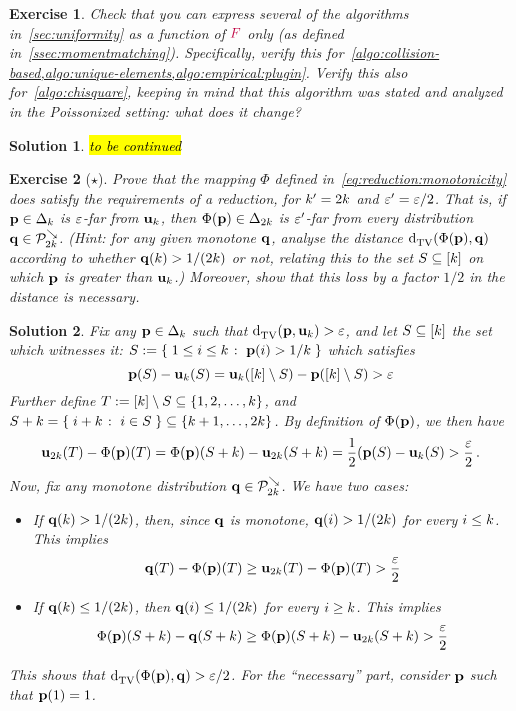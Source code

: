 \documentclass[biber]{nowfnt} %
\newtheorem{question}{Exercise}[chapter]
\newtheorem{solution}{Solution}[chapter]
\newcommand{\tbc}{\noindent\hl{\sc{}to be continued}\xspace}
\newcommand{\tbc}{}
\newcommand{\freq}{\textcolor{purple}{F}}
\newcommand{\freq}{F}
\begin{document}
\begin{question}\label{exo:reexpress:algos:frequency:only}
Check that you can express several of the algorithms in~\cref{sec:uniformity} as a function of $\freq$ only (as defined in~\cref{ssec:momentmatching}). Specifically, verify this for~\cref{algo:collision-based,algo:unique-elements,algo:empirical:plugin}. Verify this also for~\cref{algo:chisquare}, keeping in mind that this algorithm was stated and analyzed in the Poissonized setting: what does it change?
\end{question}
\begin{solution}
\tbc
\end{solution}

\begin{question}[$\star$]\label{ex:reduction:monotone}
  Prove that the mapping $\Phi$ defined in~\cref{eq:reduction:monotonicity} does satisfy the requirements of a reduction, for $k'=2k$ and $\varepsilon'=\varepsilon/2$. That is, if $\mathbf{p}\in\Delta_{k}$ is $\varepsilon$-far from $\mathbf{u}_k$, then $\Phi(\mathbf{p})\in\Delta_{2k}$ is $\varepsilon'$-far from every distribution $\mathbf{q}\in\mathcal{P}^{\searrow}_{2k}$. \textit{(Hint: for any given monotone $\mathbf{q}$, analyse the distance $\totalvardist{\Phi(\p)}{\q}$ according to whether $\mathbf{q}(k) > 1/(2k)$ or not, relating this to the set $S\subseteq[k]$ on which $\mathbf{p}$ is greater than $\mathbf{u}_k$.)} Moreover, show that this loss by a factor $1/2$ in the distance is necessary.
\end{question}
\begin{solution}
Fix any $\mathbf{p}\in\Delta_{k}$ such that $\totalvardist{\p}{\uniform_\ab}>\dst$, and let $S\subseteq [k]$ the set which witnesses it:
$S\eqdef \setOfSuchThat{ 1\leq i\leq \ab }{\p(i)> 1/\ab }$ 
which satisfies 
\[
	\mathbf{p}(S)-\mathbf{u}_k(S) = \mathbf{u}_k([k]\setminus S)- \mathbf{p}([k]\setminus S) >\varepsilon
\]
Further define $T := [k]\setminus S \subseteq \{1,2,\dots,k\}$, and $S+\ab = \setOfSuchThat{i+\ab}{i\in S} \subseteq \{\ab+1,\dots,2\ab\}$. 
By definition of $\Phi(\mathbf{p})$, we then have
\[
	\mathbf{u}_{2k}(T)-\Phi(\mathbf{p})(T)=\Phi(\mathbf{p})(S+k)-\mathbf{u}_{2k}(S+k)= \frac{1}{2}(\mathbf{p}(S)-\mathbf{u}_k(S)>\frac{\varepsilon}{2}\,.
\]
Now, fix any monotone distribution $\mathbf{q}\in\mathcal{P}^{\searrow}_{2k}$. We have two cases:
\begin{itemize}
\item If $\mathbf{q}(k) > 1/(2k)$, then, since $\mathbf{q}$ is monotone, $\mathbf{q}(i) > 1/(2k)$ for every $i \leq k$. This implies
\[
	\mathbf{q}(T)-\Phi(\mathbf{p})(T) \geq \mathbf{u}_{2k}(T)-\Phi(\mathbf{p})(T) > \frac{\varepsilon}{2}
\]
\item If $\mathbf{q}(k) \leq 1/(2k)$, then $\mathbf{q}(i) \leq 1/(2k)$ for every $i \geq k$. This implies
\[
	\Phi(\mathbf{p})(S+k)-\mathbf{q}(S+k) \geq \Phi(\mathbf{p})(S+k)-\mathbf{u}_{2k}(S+k) > \frac{\varepsilon}{2}
\]
\end{itemize}
This shows that $\totalvardist{\Phi(\p)}{\q} > \dst/2$. For the ``necessary'' part, consider $\mathbf{p}$ such that $\mathbf{p}(1)=1$.
\end{solution}
\end{document}

